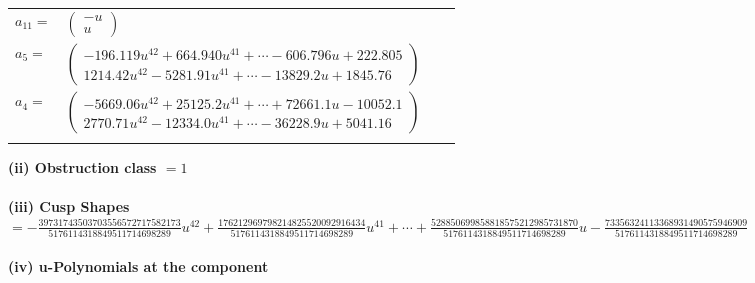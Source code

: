 \documentclass[1p]{elsarticle_modified}
\theoremstyle{definition}
\begin{document}
\begin{tabular}{m{7pt} m{180pt} m{7pt} m{180pt} }
\flushright $a_{11}=$&$\begin{pmatrix}- u\\u\end{pmatrix}$ \\
\flushright $a_{5}=$&$\begin{pmatrix}-196.119 u^{42}+664.940 u^{41}+\cdots-606.796 u+222.805\\1214.42 u^{42}-5281.91 u^{41}+\cdots-13829.2 u+1845.76\end{pmatrix}$ \\
\flushright $a_{4}=$&$\begin{pmatrix}-5669.06 u^{42}+25125.2 u^{41}+\cdots+72661.1 u-10052.1\\2770.71 u^{42}-12334.0 u^{41}+\cdots-36228.9 u+5041.16\end{pmatrix}$\\&\end{tabular}
\flushleft \textbf{(ii) Obstruction class $= 1$}\\~\\
\flushleft \textbf{(iii) Cusp Shapes $= -\frac{39731743503703556572717582173}{5176114318849511714698289} u^{42}+\frac{176212969798214825520092916434}{5176114318849511714698289} u^{41}+\cdots+\frac{528850699858818575212985731870}{5176114318849511714698289} u-\frac{73356324113368931490575946909}{5176114318849511714698289}$}\\~\\
\newpage\renewcommand{\arraystretch}{1}
\flushleft \textbf{(iv) u-Polynomials at the component}\newline \\
\end{document}
